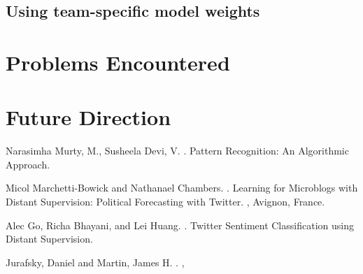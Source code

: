\documentclass[11pt,letterpaper]{article}
\begin{document}
\subsection{Using team-specific model weights}
\section{Problems Encountered}


\section{Future Direction}


\begin{thebibliography}{}

Narasimha Murty, M., Susheela Devi, V.
.
\newblock Pattern Recognition: An Algorithmic Approach.

Micol Marchetti-Bowick and Nathanael Chambers.
.
\newblock Learning for Microblogs with Distant Supervision: Political Forecasting with Twitter.
,
\newblock Avignon, France.

Alec Go, Richa Bhayani, and Lei Huang.
.
\newblock Twitter Sentiment Classification using Distant Supervision.

Jurafsky, Daniel and Martin, James H.
.
,

\end{thebibliography}
\end{document}
